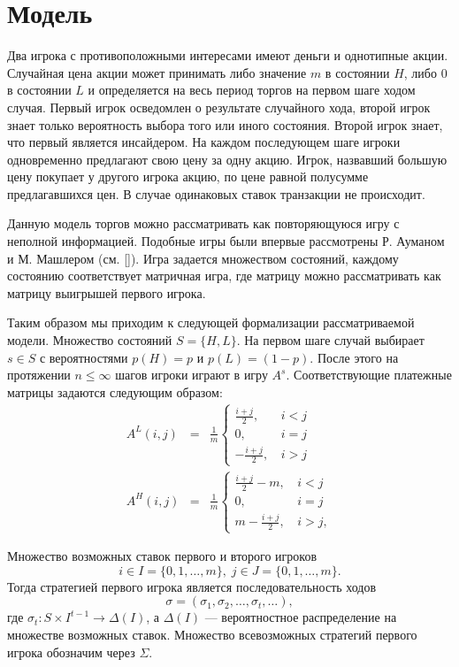 \section{Модель}
Два игрока с противоположными интересами имеют деньги и однотипные акции. Случайная цена акции может принимать либо значение $ m $ в состоянии $ H $, либо $ 0 $ в состоянии $ L $ и определяется на весь период торгов на первом шаге ходом случая. Первый игрок осведомлен о результате случайного хода, второй игрок знает только вероятность выбора того или иного состояния. 
Второй игрок знает, что первый является инсайдером.
На каждом последующем шаге игроки одновременно предлагают свою цену за одну акцию. Игрок, назвавший большую цену покупает у другого игрока акцию, по цене равной полусумме предлагавшихся цен. В случае одинаковых ставок транзакции не происходит.

Данную модель торгов можно рассматривать как повторяющуюся игру с неполной информацией. Подобные игры были впервые рассмотрены Р. Ауманом и М. Машлером (см. [\aumann]). Игра задается множеством состояний, каждому состоянию соответствует матричная игра, где матрицу можно рассматривать как матрицу выигрышей первого игрока.

Таким образом мы приходим к следующей формализации рассматриваемой модели.
Множество состояний $ S = \{H, L\} $. На первом шаге случай выбирает $ s \in S $ с вероятностями $ p(H) = p $ и $ p(L) = (1 - p) $.
После этого на протяжении $ n \leq \infty $ шагов игроки играют в игру $ A^s $.
Соответствующие платежные матрицы задаются следующим образом:
\begin{eqnarray*}
A^L(i, j) &=& \frac{1}{m}\begin{cases}
\frac{i+j}{2}, &\, i < j\\
0, &\, i = j\\
-\frac{i+j}{2}, &\, i > j
\end{cases}
\\
A^H(i, j) &=& \frac{1}{m}\begin{cases}
\frac{i+j}{2} - m, &\, i < j\\
0, &\, i = j\\
m - \frac{i+j}{2}, &\, i > j,
\end{cases}
\end{eqnarray*}



Множество возможных ставок первого и второго игроков 
\[
  i \in I = \{0, 1, \ldots, m\}, \;
  j \in J = \{0, 1, \ldots, m\}.
\]
Тогда стратегией первого игрока является последовательность ходов
\[
  \sigma = (\sigma_1, \sigma_2, \ldots, \sigma_t, \ldots),
\]
где $ \sigma_t: S \times I^{t-1} \rightarrow \Delta(I) $, а $ \Delta(I) $ --- вероятностное распределение на множестве возможных ставок. Множество всевозможных стратегий первого игрока обозначим через $ \Sigma $.

